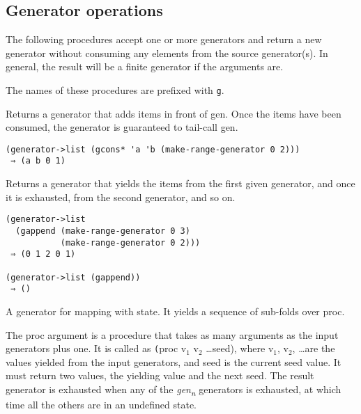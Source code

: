 \subsection{Generator operations}

The following procedures accept one or more generators and return a new
generator without consuming any elements from the source generator(s).
In general, the result will be a finite generator if the arguments are.

The names of these procedures are prefixed with \texttt{g}.

\begin{entry}{%
  }

Returns a generator that adds items in front of gen. Once the items have
been consumed, the generator is guaranteed to tail-call gen.

\begin{verbatim}
(generator->list (gcons* 'a 'b (make-range-generator 0 2)))
 ⇒ (a b 0 1)
\end{verbatim}
\end{entry}

\begin{entry}{%
  }

Returns a generator that yields the items from the first given
generator, and once it is exhausted, from the second generator, and so
on.

\begin{verbatim}
(generator->list 
  (gappend (make-range-generator 0 3) 
           (make-range-generator 0 2)))
 ⇒ (0 1 2 0 1)

(generator->list (gappend))
 ⇒ ()
\end{verbatim}
\end{entry}

\begin{entry}{%
  }


A generator for mapping with state. It yields a sequence of sub-folds
over proc.

The proc argument is a procedure that takes as many arguments as the
input generators plus one. It is called as \texttt{(}proc
v$_1$ v$_2$ \ldots seed), where
v$_1$, v$_2$, \ldots are the values yielded
from the input generators, and seed is the current seed value. It must
return two values, the yielding value and the next seed. The result
generator is exhausted when any of the \emph{gen\textsubscript{n}}
generators is exhausted, at which time all the others are in an
undefined state.
\end{entry}

